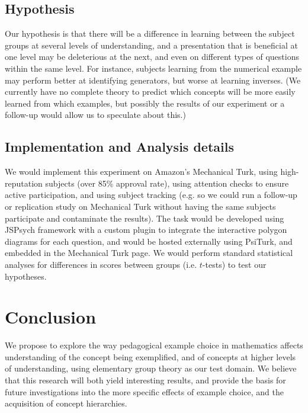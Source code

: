 \documentclass[11pt]{article}
\begin{document}
\subsection{Hypothesis}
Our hypothesis is that there will be a difference in learning between the subject groups at several levels of understanding, and a presentation that is beneficial at one level may be deleterious at the next, and even on different types of questions within the same level. For instance, subjects learning from the numerical example may perform better at identifying generators, but worse at learning inverses. (We currently have no complete theory to predict which concepts will be more easily learned from which examples, but possibly the results of our experiment or a follow-up would allow us to speculate about this.)
\subsection{Implementation and Analysis details}
We would implement this experiment on Amazon's Mechanical Turk, using high-reputation subjects (over 85\% approval rate), using attention checks to ensure active participation, and using subject tracking (e.g. so we could run a follow-up or replication study on Mechanical Turk without having the same subjects participate and contaminate the results). The task would be developed using JSPsych framework with a custom plugin to integrate the interactive polygon diagrams for each question, and would be hosted externally using PsiTurk, and embedded in the Mechanical Turk page. We would perform standard statistical analyses for differences in scores between groups (i.e. $t$-tests) to test our hypotheses. 

\section{Conclusion}
We propose to explore the way pedagogical example choice in mathematics affects understanding of the concept being exemplified, and of concepts at higher levels of understanding, using elementary group theory as our test domain. We believe that this research will both yield interesting results, and provide the basis for future investigations into the more specific effects of example choice, and the acquisition of concept hierarchies.
 




\setcounter{secnumdepth}{-1}
\end{document}
